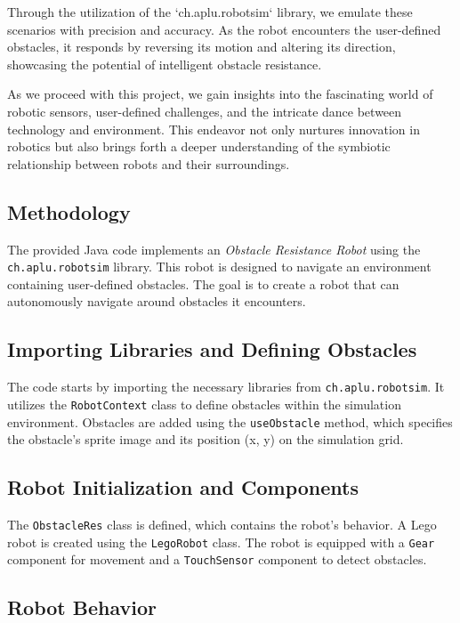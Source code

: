 Through the utilization of the `ch.aplu.robotsim` library, we emulate these scenarios with precision and accuracy. As the robot encounters the user-defined obstacles, it responds by reversing its motion and altering its direction, showcasing the potential of intelligent obstacle resistance.

As we proceed with this project, we gain insights into the fascinating world of robotic sensors, user-defined challenges, and the intricate dance between technology and environment. This endeavor not only nurtures innovation in robotics but also brings forth a deeper understanding of the symbiotic relationship between robots and their surroundings.


\subsection{Methodology}
The provided Java code implements an \textit{Obstacle Resistance Robot} using the \texttt{ch.aplu.robotsim} library. This robot is designed to navigate an environment containing user-defined obstacles. The goal is to create a robot that can autonomously navigate around obstacles it encounters.

\subsection{Importing Libraries and Defining Obstacles}

The code starts by importing the necessary libraries from \texttt{ch.aplu.robotsim}. It utilizes the \texttt{RobotContext} class to define obstacles within the simulation environment. Obstacles are added using the \texttt{useObstacle} method, which specifies the obstacle's sprite image and its position (x, y) on the simulation grid.

\subsection{Robot Initialization and Components}

The \texttt{ObstacleRes} class is defined, which contains the robot's behavior. A Lego robot is created using the \texttt{LegoRobot} class. The robot is equipped with a \texttt{Gear} component for movement and a \texttt{TouchSensor} component to detect obstacles.

\subsection{Robot Behavior}


